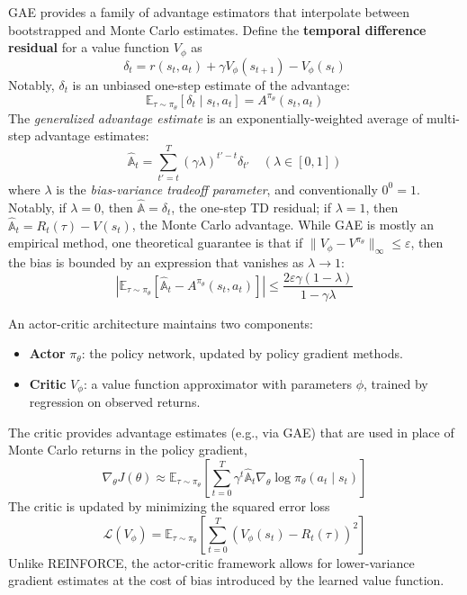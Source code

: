 \documentclass[11pt, letterpaper]{article}
\let\leq\leqslant
\begin{document}
\begin{concept}
    GAE provides a family of advantage estimators that interpolate between bootstrapped and Monte Carlo estimates. Define the \textbf{temporal difference residual} for a value function \(V_\phi\) as 
    \[
        \delta_t = r(s_t, a_t) + \gamma V_\phi(s_{t+1}) - V_\phi(s_t)
    \]
    Notably, \(\delta_t\) is an unbiased one-step estimate of the advantage: 
    \[
        \mathbb{E}_{\tau \sim \pi_\theta}\left[\delta_t \mid s_t, a_t\right] = A^{\pi_\theta}(s_t, a_t)
    \]
    The \textit{generalized advantage estimate} is an exponentially-weighted average of multi-step advantage estimates: 
    \[
        \widehat{\mathbb{A}}_t = \sum_{t'=t}^{T} (\gamma\lambda)^{t'-t} \delta_{t'} \quad (\lambda \in [0,1])
    \]
    where \(\lambda\) is the \textit{bias-variance tradeoff parameter}, and conventionally \(0^0 = 1\). Notably, if \(\lambda=0\), then \(\widehat{\mathbb{A}} = \delta_t\), the one-step TD residual; if \(\lambda = 1\), then \(\widehat{\mathbb{A}}_t = R_t(\tau) - V(s_t)\), the Monte Carlo advantage. While GAE is mostly an empirical method, one theoretical guarantee is that if \(\|V_\phi - V^{\pi_\theta}\|_\infty \leq \varepsilon\), then the bias is bounded by an expression that vanishes as \(\lambda \to 1\): 
    \[
        \left| \mathbb{E}_{\tau \sim \pi_\theta}[\widehat{\mathbb{A}}_t - A^{\pi_\theta}(s_t, a_t)] \right| \leq \frac{2\varepsilon\gamma(1 - \lambda)}{1 - \gamma\lambda}
    \]
\end{concept}

\begin{concept}
    An actor-critic architecture maintains two components: 
    \begin{itemize}
        \item \textbf{Actor} \(\pi_\theta\): the policy network, updated by policy gradient methods. 
        \item \textbf{Critic} \(V_\phi\): a value function approximator with parameters \(\phi\), trained by regression on observed returns. 
    \end{itemize}
    The critic provides advantage estimates (e.g., via GAE) that are used in place of Monte Carlo returns in the policy gradient, 
    \[
        \nabla_\theta J(\theta) \approx \mathbb{E}_{\tau \sim \pi_\theta} \left[ \sum_{t=0}^T \gamma^t \widehat{\mathbb{A}}_t \nabla_\theta \log \pi_\theta(a_t \mid s_t) \right]
    \]
    The critic is updated by minimizing the squared error loss 
    \[
        \mathcal{L}(V_\phi) = \mathbb{E}_{\tau \sim \pi_\theta}\left[\sum_{t=0}^T (V_\phi(s_t) - R_t(\tau))^2\right]
    \]
    Unlike REINFORCE, the actor-critic framework allows for lower-variance gradient estimates at the cost of bias introduced by the learned value function. 
\end{concept}
\end{document}
